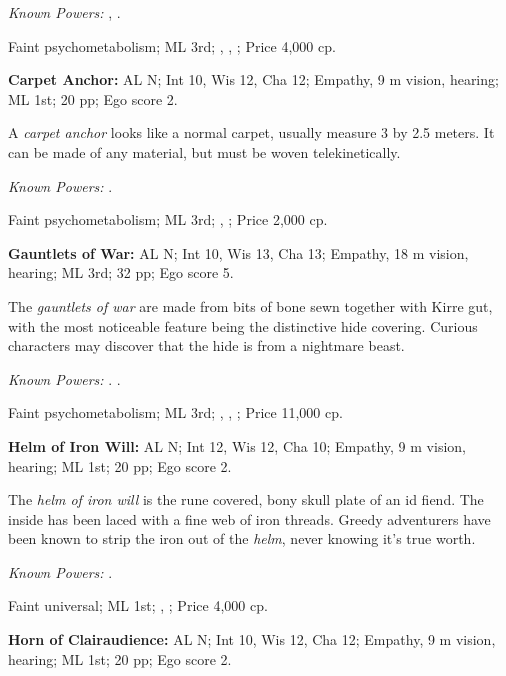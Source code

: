 \textit{Known Powers:}
    , %
    . %

Faint psychometabolism;
ML 3rd;
,
,
;
Price 4,000 cp.



\textbf{Carpet Anchor:}
AL N;
Int 10, Wis 12, Cha 12;
Empathy, 9 m vision, hearing;
ML 1st;
20 pp;
Ego score 2.

A \emph{carpet anchor} looks like a normal carpet, usually measure 3 by 2.5 meters. It can be made of any material, but must be woven telekinetically.

\textit{Known Powers:}
    . %

Faint psychometabolism;
ML 3rd;
,
;
Price 2,000 cp.



\textbf{Gauntlets of War:}
AL N;
Int 10, Wis 13, Cha 13;
Empathy, 18 m vision, hearing;
ML 3rd;
32 pp;
Ego score 5.

The \emph{gauntlets of war} are made from bits of bone sewn together with Kirre gut, with the most noticeable feature being the distinctive hide covering. Curious characters may discover that the hide is from a nightmare beast.

\textit{Known Powers:}
    . %
    . %

Faint psychometabolism;
ML 3rd;
,
,
;
Price 11,000 cp.



\textbf{Helm of Iron Will:}
AL N;
Int 12, Wis 12, Cha 10;
Empathy, 9 m vision, hearing;
ML 1st;
20 pp;
Ego score 2.

The \emph{helm of iron will} is the rune covered, bony skull plate of an id fiend. The inside has been laced with a fine web of iron threads. Greedy adventurers have been known to strip the iron out of the \emph{helm}, never knowing it's true worth.

\textit{Known Powers:}
    . %

Faint universal;
ML 1st;
,
;
Price 4,000 cp.



\textbf{Horn of Clairaudience:}
AL N;
Int 10, Wis 12, Cha 12;
Empathy, 9 m vision, hearing;
ML 1st;
20 pp;
Ego score 2.

